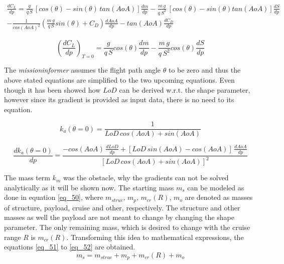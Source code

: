 \begin{multline}
    \label{eq_46}
        \frac{dC_L}{dp} = \frac{g}{q\, S}\, [cos (\theta) - sin(\theta)\, tan(AoA)]
        \frac{dm}{dp} -
         \frac{m \, g}{q \ S^{2}}\,[cos(\theta) - sin (\theta) 
        tan(AoA)] \frac{dS}{dp} \\
        - \frac{1}{cos(AoA)^{2}} \left(\frac{m\, g}{q \, S} sin(\theta) + C_D
        \right) \frac{dAoA}{dp} - tan (AoA) \frac{dC_D}{dp}
\end{multline}

\begin{equation}
    \label{eq_47}
    \left(\frac{dC_L}{dp}\right)_{T=0} = \frac{g}{q\, S}cos(\theta) 
    \frac{dm}{dp} - \frac{m\, g}{q\, S^{2}} cos(\theta)\frac{dS}{dp}
\end{equation}

The \emph{missioninformer} assumes the flight 
path angle $\theta$ to be zero and thus the 
above stated equations are simplified to 
the two upcoming equations. Even though 
it has been showed how $LoD$ can be 
derived w.r.t. the shape parameter, however 
since its gradient is provided 
as input data, there is no need 
to its equation.


\begin{equation}
    \label{eq_48}
    k_a (\theta = 0)  = \frac{1 }{LoD \, cos(AoA) + sin(AoA)}
\end{equation}

\begin{equation}
    \label{eq_49}
    \frac{dk_a(\theta = 0)}{dp} =
     \frac{- cos(AoA)
    \,\frac{dLoD}{dp} + [LoD \,sin(AoA) - cos (AoA)] 
    \, \frac{dAoA}{dp} }
    {[LoD \, cos(AoA) + sin (AoA)]^{2}}
\end{equation}

The mass term $k_m$ was the obstacle, why the gradients 
can not be solved  analytically as it will be shown now.
The starting mass $m_s$ can be modeled as 
done in equation \eqref{eq_50}, where 
$m_{struc},\, m_p,\,  m_{cr}(R),\, m_o$ are denoted 
as masses of structure, payload, cruise and other, respectively.
The structure and other masses as well the payload 
are not meant to change by changing the shape parameter.
The only remaining mass, which is desired to 
change with the cruise range $R$ is $m_{cr}(R)$. 
Transforming this idea to mathematical expressions,
the equations \eqref{eq_51} to \eqref{eq_52}
are obtained.
\begin{equation}
    \label{eq_50}
    m_s = m_{struc} + m_p + m_{cr}(R) + m_o
\end{equation}

